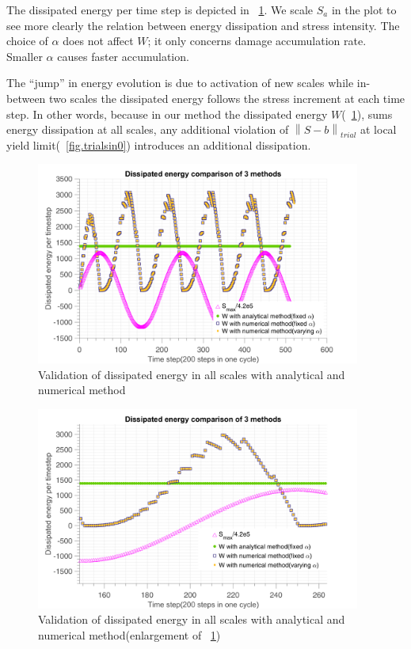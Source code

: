 \documentclass[3p,times,number,review]{elsarticle}
\newcommand{\figref}[1]{\figurename~\ref{#1}}
\begin{document}
The dissipated energy per time step is depicted in \figref{fig.W3methods}. We scale $S_{a}$ in the plot to see more clearly the relation between energy dissipation and stress intensity. The choice of $\alpha$ does not affect $W$; it only concerns damage accumulation rate. Smaller $\alpha$ causes faster accumulation.

The ``jump'' in energy evolution is due to activation of new scales while in-between two scales the dissipated energy follows the stress increment at each time step. In other words, because in our method the dissipated energy $W$(\figref{fig.W3methods}), sums energy dissipation at all scales, any additional violation of $\left\|S-b \right\|_{trial}$ at local yield limit(\figref{fig.trialsin0}) introduces an additional dissipation. 

\begin{figure}[!h]
\centering
\includegraphics[width=0.95\textwidth]{figures//W_3methods.png} 
\caption{Validation of dissipated energy in all scales with analytical and numerical method }
\label{fig.W3methods}
\end{figure}
\begin{figure}[!h]
	\centering
	\includegraphics[width=0.95\textwidth]{figures//W_3methods_enlarge.png} 
	\caption{Validation of dissipated energy in all scales with analytical and numerical method(enlargement of \figref{fig.W3methods})}
	\label{fig.W3methodsenlarge}
\end{figure}
\end{document}
